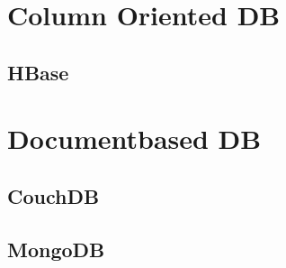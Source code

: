 \part{Column Oriented DB}
\chapter{HBase}


\part{Documentbased DB}
 
\chapter{CouchDB}


\chapter{MongoDB}






